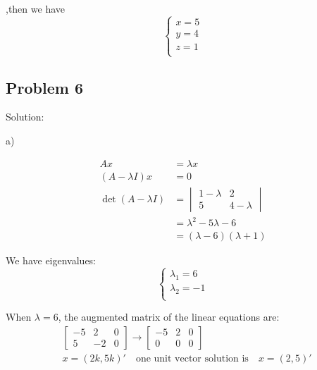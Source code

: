 \documentclass[letterpaper, 11pt]{article}
\newcommand{\1}{\mathds{1}}	%
\theoremstyle{definition}
\begin{document}
,then we have \begin{equation*}
    \left\{\begin{array}{l}
        x = 5\\
        y = 4\\
        z = 1\\
    \end{array}\right.
\end{equation*}


\subsection*{Problem 6}

Solution:

a)

\begin{align*}
    Ax &=\lambda x \\
    (A-\lambda I) x &= 0 \\
    \det (A - \lambda I) &=\begin{vmatrix}
        1- \lambda  & 2 \\
        5 & 4-\lambda
    \end{vmatrix} \\
    &= \lambda ^{2} - 5 \lambda - 6 \\
    &= (\lambda-6)(\lambda + 1)
\end{align*}

We have eigenvalues: \begin{equation*}
    \left\{\begin{array}{l}
        \lambda_{1} = 6 \\
        \lambda_{2} = -1\\
    \end{array}\right.
\end{equation*}

When $\lambda=6$, the augmented matrix of the linear equations are:
\begin{align*}
    &\left[\begin{array}{cc|c}
        -5 & 2 & 0 \\
        5 & -2 & 0 
    \end{array}\right] \to \left[\begin{array}{cc|c}
        -5 & 2 & 0 \\
        0 & 0 & 0 
    \end{array}\right] \\
    &x = (2k , 5k)'\quad \text{one unit vector solution is} \quad x = (2,5)'
\end{align*}
\end{document}
